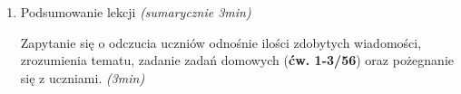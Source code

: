 \documentclass[a5paper,10pt,bibliography=totoc]{article}
\newcommand{\zadanie}[4]{%
	#1 \textit{(ok. #3min)}%
	\begin{figure}[h!]%
		\centering%
  		\texttt{[image: \#2]}%
	\end{figure}%
}
\begin{document}
\begin{enumerate}
\begin{enumerate}[label=\alph*)]
		\item \zadanie{Zadanie 6/127}{6-127.png}{3}{3in} \nopagebreak[4]
		
		Zadanie zostaje wykonane ustnie, jednakże nauczyciel poleca aktywność w postaci narysowania przykładów albo na tablicy.
		\newline
		
		\item \zadanie{Zadanie 7/127}{7-127.png}{4}{3in} \nopagebreak[4]
		
		\textbf{Zadanie dodatkowe}, gdyby wcześniejsze zadania przebiegły przed czasem. Zadanie zostaje wykonane ustnie, jednakże nauczyciel poleca aktywność w postaci narysowania przykładów albo na tablicy.
		\newline

	\end{enumerate}
		
    \item Podsumowanie lekcji \textit{(sumarycznie 3min)}

Zapytanie się o odczucia uczniów odnośnie ilości zdobytych wiadomości, zrozumienia tematu, zadanie zadań domowych (\textbf{ćw. 1-3/56}) oraz pożegnanie się z uczniami. \textit{(3min)}
\end{enumerate}
\end{document}
